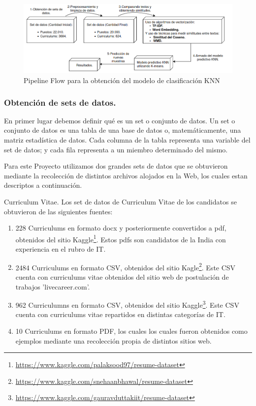 \documentclass[12pt,a4paper]{article}
\makeatletter
\renewcommand\paragraph{\@startsection{paragraph}{4}{\z@}
            {-2.5ex\@plus -1ex \@minus -.25ex}
            {1.25ex \@plus .25ex}
            {\normalfont\normalsize\bfseries}}
\makeatother
\begin{document}
\begin{sloppypar}
\begin{figure}[H]    %
  \centering
  \includegraphics[width=1\textwidth]{images/flow-core.png} 	%
  \caption{Pipeline Flow para la obtención del modelo de clasificación KNN}  
  \label{fig:FlowCoreSystem}
\end{figure}

\cleardoublepage

\subsubsection{Obtención de sets de datos.}
En primer lugar debemos definir qué es un set o conjunto de datos.
Un set o conjunto de datos es una tabla de una base de datos o, matemáticamente, una matriz estadística de datos. Cada columna de la tabla representa una variable del set de datos; y cada fila representa a un miembro determinado del mismo.

Para este Proyecto utilizamos dos grandes sets de datos que se obtuvieron mediante la recolección de distintos archivos alojados en la Web, los cuales estan descriptos a continuación.

\paragraph{Curriculum Vitae.}
Los set de datos de Curriculum Vitae de los candidatos se obtuvieron de las siguientes fuentes:

\begin{enumerate}
\item 228 Curriculums en formato docx y posteriormente convertidos a pdf, obtenidos del sitio Kaggle\footnote{\url{https://www.kaggle.com/palaksood97/resume-dataset}}. Estos pdfs son candidatos de la India con experiencia en el rubro de IT.
\item 2484 Curriculums en formato CSV, obtenidos del sitio Kagle\footnote{\url{https://www.kaggle.com/snehaanbhawal/resume-dataset}}. Este CSV cuenta con curriculums vitae obtenidos del sitio web de postulación de trabajos 'livecareer.com'.
\item 962 Curriculumns en formato CSV, obtenidos del sitio Kaggle\footnote{\url{https://www.kaggle.com/gauravduttakiit/resume-dataset}}. Este CSV cuenta con curriculums vitae repartidos en distintas categorías de IT.
\item 10 Curriculums en formato PDF, los cuales los cuales fueron obtenidos como ejemplos mediante una recolección propia de distintos sitios web. 
\end{enumerate}


\end{sloppypar}
\end{document}

